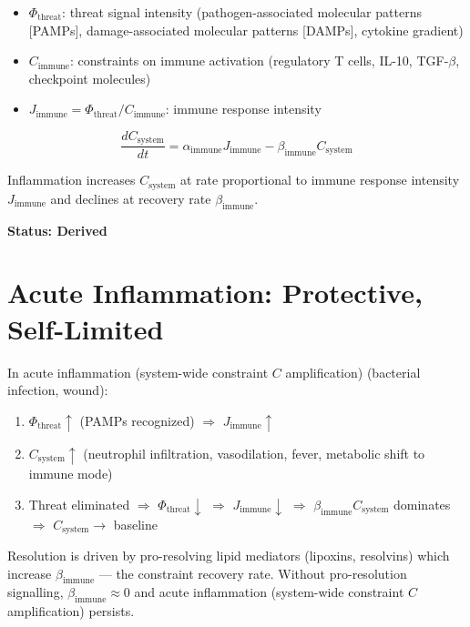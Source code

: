 \documentclass[12pt,a4paper]{article}
\begin{document}
\begin{itemize}
    \item $\Phi_{\mathrm{threat}}$: threat signal intensity (pathogen-associated molecular patterns [PAMPs], damage-associated molecular patterns [DAMPs], cytokine gradient)
    \item $C_{\mathrm{immune}}$: constraints on immune activation (regulatory T cells, IL-10, TGF-$\beta$, checkpoint molecules)
    \item $J_{\mathrm{immune}} = \Phi_{\mathrm{threat}} / C_{\mathrm{immune}}$: immune response intensity
\end{itemize}

\begin{equation}
    \frac{dC_{\mathrm{system}}}{dt} = \alpha_{\mathrm{immune}} J_{\mathrm{immune}} - \beta_{\mathrm{immune}} C_{\mathrm{system}}
\end{equation}

Inflammation increases $C_{\mathrm{system}}$ at rate proportional to immune response intensity $J_{\mathrm{immune}}$ and declines at recovery rate $\beta_{\mathrm{immune}}$.

\textbf{Status: Derived}

\section{Acute Inflammation: Protective, Self-Limited}

In acute inflammation (system-wide constraint $C$ amplification) (bacterial infection, wound):
\begin{enumerate}
    \item $\Phi_{\mathrm{threat}} \uparrow$ (PAMPs recognized) $\Rightarrow$ $J_{\mathrm{immune}} \uparrow$
    \item $C_{\mathrm{system}} \uparrow$ (neutrophil infiltration, vasodilation, fever, metabolic shift to immune mode)
    \item Threat eliminated $\Rightarrow$ $\Phi_{\mathrm{threat}} \downarrow$ $\Rightarrow$ $J_{\mathrm{immune}} \downarrow$ $\Rightarrow$ $\beta_{\mathrm{immune}} C_{\mathrm{system}}$ dominates $\Rightarrow$ $C_{\mathrm{system}} \to$ baseline
\end{enumerate}

Resolution is driven by pro-resolving lipid mediators (lipoxins, resolvins) which increase $\beta_{\mathrm{immune}}$ --- the constraint recovery rate. Without pro-resolution signalling, $\beta_{\mathrm{immune}} \approx 0$ and acute inflammation (system-wide constraint $C$ amplification) persists.
\end{document}
